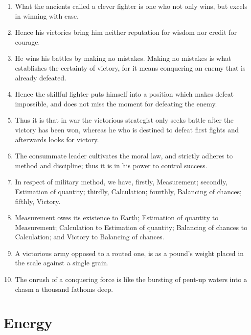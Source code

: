 \begin{enumerate}
  \item What the ancients called a clever fighter is one who not only
    wins, but excels in winning with ease.

  \item Hence his victories bring him neither reputation for wisdom
    nor credit for courage.

  \item He wins his battles by making no mistakes. Making no mistakes
    is what establishes the certainty of victory, for it means
    conquering an enemy that is already defeated.

  \item Hence the skillful fighter puts himself into a position which
    makes defeat impossible, and does not miss the moment for
    defeating the enemy.

  \item Thus it is that in war the victorious strategist only seeks
    battle after the victory has been won, whereas he who is destined
    to defeat first fights and afterwards looks for victory.

  \item The consummate leader cultivates the moral law, and strictly
    adheres to method and discipline; thus it is in his power to
    control success.

  \item In respect of military method, we have, firstly, Measurement;
    secondly, Estimation of quantity; thirdly, Calculation; fourthly,
    Balancing of chances; fifthly, Victory.

  \item Measurement owes its existence to Earth; Estimation of
    quantity to Measurement; Calculation to Estimation of quantity;
    Balancing of chances to Calculation; and Victory to Balancing of
    chances.

  \item A victorious army opposed to a routed one, is as a pound's
    weight placed in the scale against a single grain.

  \item The onrush of a conquering force is like the bursting of
    pent-up waters into a chasm a thousand fathoms deep.

  \end{enumerate}
\addtocounter{chapter}{1}\chapter*{Energy}
